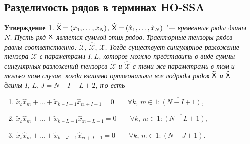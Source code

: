 \documentclass[specialist,
    substylefile = spbu_report.rtx,
    subf,href,colorlinks=true, 12pt]{disser}
\theoremstyle{plain}
\newtheorem{statement}{Утверждение}[section]
\theoremstyle{definition}
\theoremstyle{remark}
\begin{document}
    \subsection{Разделимость рядов в терминах HO-SSA}\label{subsec:tensor-ssa-separability}
    \begin{statement}
        \label{state:separability}
        $\widetilde{\mathsf{X}}=(\tilde{x}_1,\ldots , \tilde{x}_N)$, 
        $\widehat{\mathsf{X}}=(\hat{x}_1,\ldots , \hat{x}_N)$ "--- временные ряды длины $N$.
        Пусть ряд $\mathsf{X}$ является суммой этих рядов.
        Траекторные тензоры рядов равны соответственно: $\widetilde{\mathcal{X}},\, 
        \widehat{\mathcal{X}},\, \mathcal{X}$.
        Тогда существует сингулярное разложение тензора $\mathcal{X}$ с параметрами $I, L$, которое можно представить
        в виде суммы сингулярных разложений тензоров $\widetilde{\mathcal{X}}$ и $\widehat{\mathcal{X}}$
        с теми же параметрами в том и только том случае, когда взаимно ортогональны все подряды рядов
         $\widetilde{\mathsf{X}}$ и $\widehat{\mathsf{X}}$ длины $I,\, L,\, J=N-I-L+2$, то есть
        \begin{enumerate}
            \item $\tilde{x}_{k}\hat{x}_m + \ldots + \tilde{x}_{k+I-1} \hat{x}_{m+I-1}=0 \qquad \forall k,\, m\in\overline{1:(N-I+1)}$,
            \item $\tilde{x}_{k}\hat{x}_m + \ldots + \tilde{x}_{k+L-1} \hat{x}_{m+L-1}=0 \qquad \forall k,\, m\in\overline{1:(N-L+1)}$,
            \item $\tilde{x}_{k}\hat{x}_m + \ldots + \tilde{x}_{k+J-1} \hat{x}_{m+J-1}=0 \qquad \forall k,\, m\in\overline{1:(N-J+1)}$.
        \end{enumerate}
    \end{statement}
\end{document}

